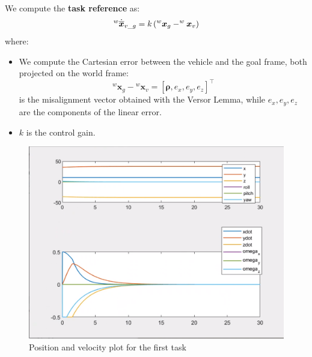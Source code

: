 \documentclass{article}
\begin{document}
\noindent
\vspace{5px}
We compute the \textbf{task reference} as:
\begin{equation}
\large
    ^{w}\dot{\overline{\boldsymbol{x}}}_{v\_g}=k\left(^{w} \boldsymbol{x}_{g}-^{w} \boldsymbol{x}_{v}\right)
\end{equation}
where:
\begin{itemize}
\item We compute the Cartesian error between the vehicle and the goal frame, both projected on the world frame:
\begin{equation}
    {^w} \boldsymbol{x}_{g} - {^w}\boldsymbol{x}_{v} = [\boldsymbol{\rho}, e_{x}, e_{y}, e_{z}]^\top
\end{equation}
\boldsymbol{$\rho$} is the misalignment vector obtained with the Versor Lemma, while $e_{x}, e_{y}, e_{z}$ are the components of the linear error. 
\item $k$ is the control gain.
\end{itemize}

\begin{figure}[!h]
    \centering
    \includegraphics[scale=0.5]{111_ppdot.png}
    \caption{Position and velocity plot for the first task}
    \label{graph_1_1}
\end{figure}
\end{document}
